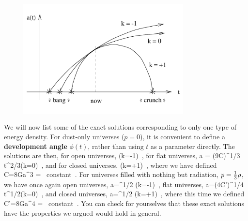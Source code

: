 \documentclass[12pt]{article}
\begin{document}
\begin{figure}[h]
  \centerline{
  \includegraphics[height=6cm]{pdf/eight2}}
\end{figure}

We will now list some of the exact solutions corresponding to 
only one type of energy density.
For dust-only universes ($p=0$), it is convenient to define
a {\bf development angle} $\phi(t)$, rather than using $t$ as
a parameter directly.  The solutions are then, for open
universes,
\be
  \qquad (k=-1)\ ,\label{8.48}
\ee
for flat universes,
\be
  a = \left({{9C}}\right)^{1/3} t^{2/3}\qquad (k=0)\ ,
  \label{8.49}
\ee
and for closed universes,
\be
  \qquad (k=+1)\ ,\label{8.50}
\ee
where we have defined
\be
  C={{8\pi G}}\rho a^3 = {\rm ~constant}\ .\label{8.51}
\ee
For universes filled with nothing but radiation, $p={1\over 3}\rho$,
we have once again open universes,
\be
  a=^{1/2}
  \qquad (k=-1)\ ,\label{8.52}
\ee
flat universes,
\be
  a=(4C')^{1/4} t^{1/2}\qquad (k=0)\ ,\label{8.53}
\ee
and closed universes,
\be
  a=^{1/2}
  \qquad (k=+1)\ ,\label{8.54}
\ee
where this time we defined
\be
  C'={{8\pi G}}\rho a^4 = {\rm ~constant}\ .\label{8.55}
\ee
You can check for yourselves that these exact solutions have 
the properties we argued would hold in general.
\end{document}
